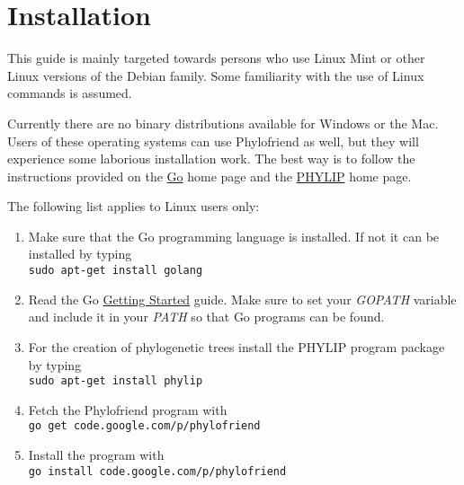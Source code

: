 \section{Installation}

This guide is mainly targeted towards persons who use Linux Mint
or other Linux versions of the Debian family. Some familiarity
with the use of Linux commands is assumed.

Currently there are no binary distributions available for
Windows or the Mac. Users of these operating systems can
use Phylofriend as well, but they will experience some
laborious installation work. The best way is to follow the
instructions provided on the
\href{http://golang.org/}{Go} home page and the
\href{http://evolution.genetics.washington.edu/phylip.html}{PHYLIP}
home page.

The following list applies to Linux users only:

\begin{enumerate}
\item Make sure that the Go programming language is installed.
	If not it can be installed by typing\\
	\texttt{sudo apt-get install golang}
\item Read the Go
	\href{http://golang.org/doc/install}{Getting Started}
	guide. Make sure to set your \emph{GOPATH} variable and
	include it in your \emph{PATH} so that Go programs can be
	found.
\item For the creation of phylogenetic trees install the
	PHYLIP program package by typing\\
	\texttt{sudo apt-get install phylip}
\item Fetch the Phylofriend program with\\
	\texttt{go get code.google.com/p/phylofriend}
\item Install the program with\\
	 \texttt{go install code.google.com/p/phylofriend}
\end{enumerate}

